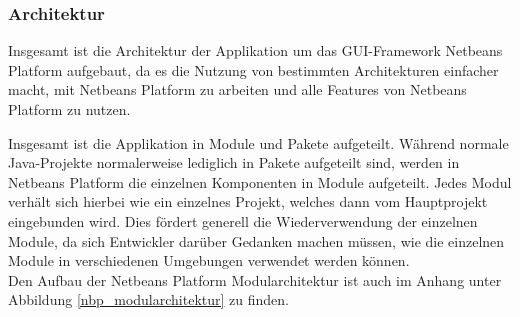\subsubsection{Architektur}
Insgesamt ist die Architektur der Applikation um das GUI-Framework Netbeans Platform aufgebaut, da es die Nutzung von bestimmten Architekturen einfacher macht, mit Netbeans Platform zu arbeiten und alle Features von Netbeans Platform zu nutzen.

Insgesamt ist die Applikation in Module und Pakete aufgeteilt. Während normale Java-Projekte normalerweise lediglich in Pakete aufgeteilt sind, werden in Netbeans Platform die einzelnen Komponenten in Module aufgeteilt. Jedes Modul verhält sich hierbei wie ein einzelnes Projekt, welches dann vom Hauptprojekt eingebunden wird. Dies fördert generell die Wiederverwendung der einzelnen Module, da sich Entwickler darüber Gedanken machen müssen, wie die einzelnen Module in verschiedenen Umgebungen verwendet werden können. \\
Den Aufbau der Netbeans Platform Modularchitektur ist auch im Anhang unter Abbildung \ref{nbp_modularchitektur} zu finden.

